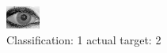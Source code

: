 \begin{figure}[h!]
\begin{center}
\includegraphics[width=0.60\columnwidth]{figures/ID2036_class_1_target_2.png}
\end{center}
\caption{ Classification: 1 actual target: 2}
\label{fig:ID2036_class_1_target_2}
\end{figure}
